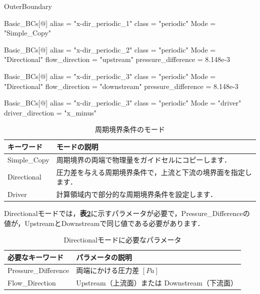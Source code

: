 {\small
\begin{program}
OuterBoundary {
  Basic_BCs[@] {
    alias    = "x-dir_periodic_1"
    class    = "periodic"
    Mode     = "Simple_Copy"
  }
  
  Basic_BCs[@] {
    alias    = "x-dir_periodic_2"
    class    = "periodic"
    Mode     = "Directional"
    flow_direction = "upstream"
    pressure_difference = 8.148e-3
  }
  
  Basic_BCs[@] {
    alias    = "x-dir_periodic_3"
    class    = "periodic"
    Mode     = "Directional"
    flow_direction = "downstream"
    pressure_difference = 8.148e-3
  }
  
  Basic_BCs[@] {
    alias    = "x-dir_periodic_3"
    class    = "periodic"
    Mode     = "driver"
    driver_direction = "x_minus"
  }
}
\end{program}
}

\begin{table}[htdp]
\caption{周期境界条件のモード}
\begin{center}
\small
\begin{tabular}{ll} \toprule
キーワード & モードの説明\\ \midrule
Simple\_Copy & 周期境界の両端で物理量をガイドセルにコピーします．\\
Directional  & 圧力差を与える周期境界条件で，上流と下流の境界面を指定します．\\
Driver       & 計算領域内で部分的な周期境界条件を設定します．\\ \bottomrule
\end{tabular}
\end{center}
\label{tbl:periodic mode}
\end{table}

Directionalモードでは，\textbf{表\ref{tbl:parameter dir. mode}}に示すパラメータが必要で，Pressure\_Differenceの値が，UpstreamとDownstreamで同じ値である必要があります．

\begin{table}[htdp]
\caption{Directionalモードに必要なパラメータ}
\begin{center}
\small
\begin{tabular}{ll} \toprule
必要なキーワード & パラメータの説明\\ \midrule
Pressure\_Difference & 両端にかける圧力差 $[Pa]$\\
Flow\_Direction & Upstream（上流面）または Downstream（下流面）\\
\bottomrule
\end{tabular}
\end{center}
\label{tbl:parameter dir. mode}
\end{table}



